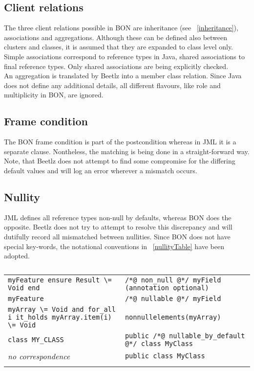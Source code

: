 \documentclass[11pt]{amsart}
\newcommand{\mytablebeg}{\begin{table}[h]\centering\begin{footnotesize}
\begin{tabular}{m{7cm}|m{7cm}} }
\newcommand{\mytableend}[2]{\end{tabular}\end{footnotesize}\caption{#1} \label{#2}\end{table}}
\newcommand{\simpleline}[2]{#1 & #2\\ \hdashline}
\begin{document}
\subsection{Client relations}\hfill \newline
The three client relations possible in BON are inheritance (see ~\ref{inheritance}), associations and aggregations. Although these can be defined also between clusters and classes, it is assumed that they are expanded to class level only. \\
Simple associations correspond to reference types in Java, shared associations to final reference types. Only shared associations are being explicitly checked. \\
An aggregation is translated by Beetlz into a member class relation. Since Java does not define any additional details, all different flavours, like role and multiplicity in BON, are ignored.

\subsection{Frame condition}\hfill \newline
The BON frame condition is part of the postcondition whereas in JML it is a separate clause. Nontheless, the matching is being done in a straight-forward way. Note, that Beetlz does not attempt to find some compromise for the differing default values and will log an error wherever a mismatch occurs.  


\subsection{Nullity}\hfill \newline
JML defines all reference types non-null by defaults, whereas BON does the opposite. Beetlz does not try to attempt to resolve this discrepancy and will dutifully record all mismatched between nullities. Since BON does not have special key-words, the notational conventions in ~\autoref{nullityTable} have been adopted.
\mytablebeg
\simpleline{\texttt{myFeature \newline ensure \newline Result \textbackslash = Void \newline end}}{\texttt{/*@ non\_null @*/ myField \newline
(annotation optional)}}
\simpleline{\texttt{myFeature}}{\texttt{/*@ nullable @*/ myField}}
\simpleline{\texttt{myArray \textbackslash = Void and \newline
for\_all i it\_holds myArray.item(i) \textbackslash = Void}}{\texttt{nonnullelements(myArray)}}
\simpleline{\texttt{class MY\_CLASS}}{\texttt{public /*@ nullable\_by\_default @*/ class MyClass}}
\simpleline{\emph{no correspondence}}{\texttt{public class MyClass}}
\mytableend{}{nullityTable}
\end{document}
